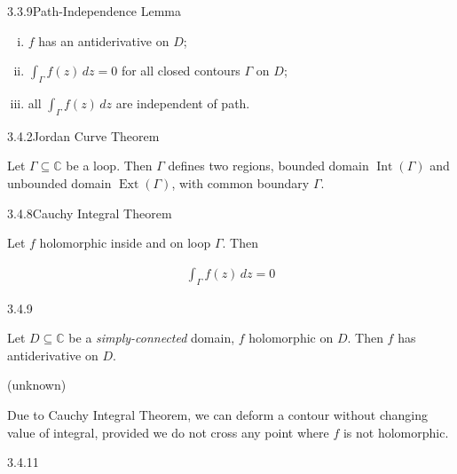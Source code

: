 \documentclass[10pt,landscape]{article}
\DeclareMathOperator{\Int}{Int}
\DeclareMathOperator{\Ext}{Ext}
\begin{document}
\begin{multicols}{3}
\begin{lemma}{3.3.9}{Path-Independence Lemma}
        \begin{enumerate}[(i)]
            \setlength{\parskip}{0em}
            \item $f$ has an antiderivative on $D$;
            \item $\int_{\Gamma} f(z)\,dz = 0$ for all closed contours $\Gamma$ on $D$;
            \item all $\int_{\Gamma} f(z)\,dz$ are independent of path.
        \end{enumerate}

\end{lemma}

\begin{theorem}{3.4.2}{Jordan Curve Theorem}

    Let $\Gamma \subseteq \mathbb{C}$ be a loop. Then $\Gamma$ defines two regions, bounded domain $\Int\!{(\Gamma)}$ and unbounded domain $\Ext\!{(\Gamma)}$, with common boundary $\Gamma$.

\end{theorem}

\begin{theorem}{3.4.8}{Cauchy Integral Theorem}

    Let $f$ holomorphic inside and on loop $\Gamma$. Then

        \begin{align*}
            \int_{\Gamma} f(z)\,dz = 0
        \end{align*}

\end{theorem}

\begin{corollary}{3.4.9}{}

    Let $D \subseteq \mathbb{C}$ be a \emph{simply-connected} domain, $f$ holomorphic on $D$. Then $f$ has antiderivative on $D$.

\end{corollary}

\begin{remark}{(unknown)}{}

    Due to Cauchy Integral Theorem, we can deform a contour without changing value of integral, provided we do not cross any point where $f$ is not holomorphic.

\end{remark}

%
\begin{theorem}{3.4.11}{}


\end{theorem}
\end{multicols}
\end{document}

